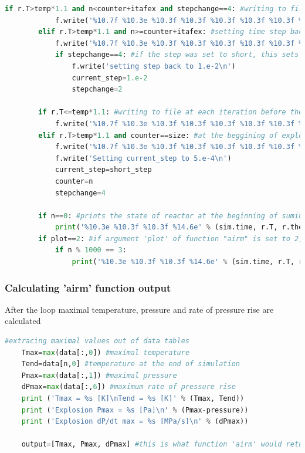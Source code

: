 \documentclass[a4paper]{article}
\begin{document}
\begin{lstlisting}[language=python]
        if r.T>temp*1.1 and n<counter+itafex and stepchange==4: #writing to file for 0.00225 seconds
            f.write('%10.7f %10.3e %10.3f %10.3f %10.3f %10.3f %10.3f %10.3f\n' % (sim.time, current_step, data[n,0]-data[n-1,0], r.T, dP, r.thermo.P, counter, n)) 
        elif r.T>temp*1.1 and n>=counter+itafex: #setting time step back to 1.e-2, 0.00225 seconds after the explosion
            f.write('%10.7f %10.3e %10.3f %10.3f %10.3f %10.3f %10.3f %10.3f\n' % (sim.time, current_step, data[n,0]-data[n-1,0], r.T, dP, r.thermo.P, counter, n)) 
            if stepchange==4: #if the step was set to short, this sets it back to basic
                f.write('setting step back to 1.e-2\n')
                current_step=1.e-2  
                stepchange=2
            
        if r.T<=temp*1.1: #writing to file at each iteration before the explosion 
            f.write('%10.7f %10.3e %10.3f %10.3f %10.3f %10.3f %10.3f %10.3f\n' % (sim.time, current_step, data[n,0]-data[n-1,0], r.T, dP, r.thermo.P, counter, n))     
        elif r.T>temp*1.1 and counter==size: #at the beggining of explosion, in the iteration where counter is still set as 'size', the step is changed to the shorter one
            f.write('%10.7f %10.3e %10.3f %10.3f %10.3f %10.3f %10.3f %10.3f\n' % (sim.time, current_step, data[n,0]-data[n-1,0], r.T, dP, r.thermo.P, counter, n))
            f.write('Setting current_step to 5.e-4\n')
            current_step=short_step
            counter=n
            stepchange=4
         
        if n==0: #prints the state of reactor at the beginning of sumiulaton
            print('%10.3e %10.3f %10.3f %14.6e' % (sim.time, r.T, r.thermo.P, r.thermo.u)) 
        if plot==2: #if argument 'plot' of function "airm" is set to 2, state of the reactor will be printed once a 1000 iterations
            if n % 1000 == 3:
                print('%10.3e %10.3f %10.3f %14.6e' % (sim.time, r.T, r.thermo.P, r.thermo.u))
\end{lstlisting}
\subsubsection{Calculating 'airm' function output}
After the loop maximal temperature, pressure and rate of pressure rise are calculated
\begin{lstlisting}[language=python]
    #extracing maximal values out of data tables
    Tmax=max(data[:,0]) #maximal temperature
    Tend=data[n,0] #temperature at the end of simulation
    Pmax=max(data[:,1]) #maximal pressure
    dPmax=max(data[:,6]) #maximum rate of pressure rise 
    print ('Tmax = %s [K]\nTend = %s [K]' % (Tmax, Tend))
    print ('Explosion Pmax = %s [Pa]\n' % (Pmax-pressure))
    print ('Explosion dP/dt max = %s [MPa/s]\n' % (dPmax))
    
    output=[Tmax, Pmax, dPmax] #this is what function 'airm' would return at the end
\end{lstlisting}
    
\end{document}
